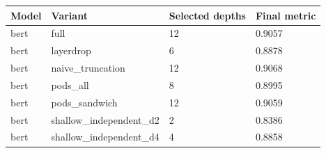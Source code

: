 \begin{tabular}{llll}
\hline
Model & Variant & Selected depths & Final metric \\
\hline
bert & full & 12 & 0.9057 \\
bert & layerdrop & 6 & 0.8878 \\
bert & naive\_truncation & 12 & 0.9068 \\
bert & pods\_all & 8 & 0.8995 \\
bert & pods\_sandwich & 12 & 0.9059 \\
bert & shallow\_independent\_d2 & 2 & 0.8386 \\
bert & shallow\_independent\_d4 & 4 & 0.8858 \\
\hline
\end{tabular}
